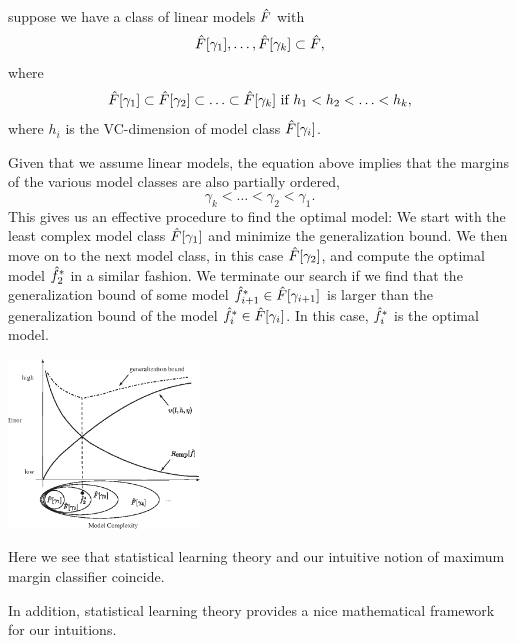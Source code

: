 \documentclass[a4paper,blends,pdf,colorBG,slideColor]{prosper}
\begin{document}

suppose we have a class of linear models $\hat{F}$ with 
\begin{equation*}
\hat{F}[\gamma_1],\ldots,\hat{F}[\gamma_k] \subset \hat{F},
\end{equation*}
where
\begin{equation*}
\hat{F}[\gamma_1] \subset \hat{F}[\gamma_2] \subset \ldots \subset \hat{F}[\gamma_k] \text{ if }
h_1 < h_2 < \ldots < h_k,
\end{equation*}
where $h_i$ is the VC-dimension of model class $\hat{F}[\gamma_i]$.  

Given that we assume linear models, the equation above implies that the margins of the various model
classes are also partially ordered,
\begin{equation*}
\gamma_k <\ldots < \gamma_2 < \gamma_1. 
\end{equation*}
This gives us an effective procedure to find the optimal model:  We start with the least
complex model class $\hat{F}[\gamma_1]$ and minimize the generalization bound.
We then move on to the next model class, in this case $\hat{F}[\gamma_2]$,
and compute the optimal model $\hat{f}_2^*$ in a similar fashion.
We terminate our search if we find that the generalization bound of some
model $\hat{f}_{i+1}^*\in \hat{F}[\gamma_{i+1}]$ is larger than the generalization
bound of the model $\hat{f}_i^*\in \hat{F}[\gamma_i]$.
In this case, $\hat{f}_i^*$ is the optimal model.


\es

\begin{center}
\includegraphics[height=45mm]{figures/fig10-07.eps}
\end{center}
Here we see that statistical learning theory and our intuitive notion of maximum margin 
classifier coincide.

In addition, statistical learning theory provides a nice mathematical 
framework for our intuitions.
\es
\end{document}
